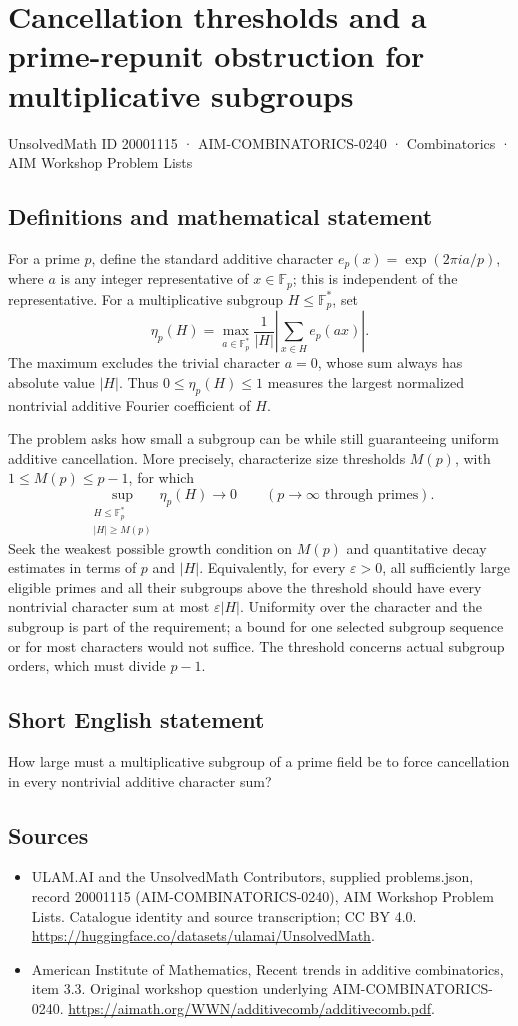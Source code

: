 \documentclass[11pt,a4paper]{article}
\begin{document}
\section*{Cancellation thresholds and a prime-repunit obstruction for multiplicative subgroups}\label{20001115}
{\small UnsolvedMath ID 20001115 · AIM-COMBINATORICS-0240 · Combinatorics · AIM Workshop Problem Lists}
\subsection{Definitions and mathematical statement}
For a prime $p$, define the standard additive character
$e_p(x)=\exp(2\pi i a/p)$, where $a$ is any integer representative of $x\in\mathbb F_p$; this is independent of the representative.
For a multiplicative subgroup $H\leq\mathbb F_p^*$, set
\[
 \eta_p(H)=\max_{a\in\mathbb F_p^*}
       \frac1{|H|}\left|\sum_{x\in H}e_p(ax)\right|.
\]
The maximum excludes the trivial character $a=0$, whose sum always has absolute value $|H|$.
Thus $0\leq\eta_p(H)\leq1$ measures the largest normalized nontrivial additive Fourier coefficient of $H$.

The problem asks how small a subgroup can be while still guaranteeing uniform additive cancellation.
More precisely, characterize size thresholds $M(p)$, with $1\leq M(p)\leq p-1$, for which
\[
 \sup_{\substack{H\leq\mathbb F_p^*\\|H|\geq M(p)}}
          \eta_p(H)\longrightarrow0
       \qquad(p\to\infty\text{ through primes}).
\]
Seek the weakest possible growth condition on $M(p)$ and quantitative decay estimates in terms of $p$ and $|H|$.
Equivalently, for every $\varepsilon>0$, all sufficiently large eligible primes and all their subgroups above the threshold should have every nontrivial character sum at most $\varepsilon|H|$.
Uniformity over the character and the subgroup is part of the requirement; a bound for one selected subgroup sequence or for most characters would not suffice.
The threshold concerns actual subgroup orders, which must divide $p-1$.
\subsection{Short English statement}
How large must a multiplicative subgroup of a prime field be to force cancellation in every nontrivial additive character sum?
\subsection{Sources}
\begin{itemize}
\item[S1] ULAM.AI and the UnsolvedMath Contributors, supplied problems.json, record 20001115 (AIM-COMBINATORICS-0240), AIM Workshop Problem Lists. Catalogue identity and source transcription; CC BY 4.0.
\url{https://huggingface.co/datasets/ulamai/UnsolvedMath}.
\item[S2] American Institute of Mathematics, Recent trends in additive combinatorics, item 3.3. Original workshop question underlying AIM-COMBINATORICS-0240.
\url{https://aimath.org/WWN/additivecomb/additivecomb.pdf}.
\end{itemize}
\end{document}
